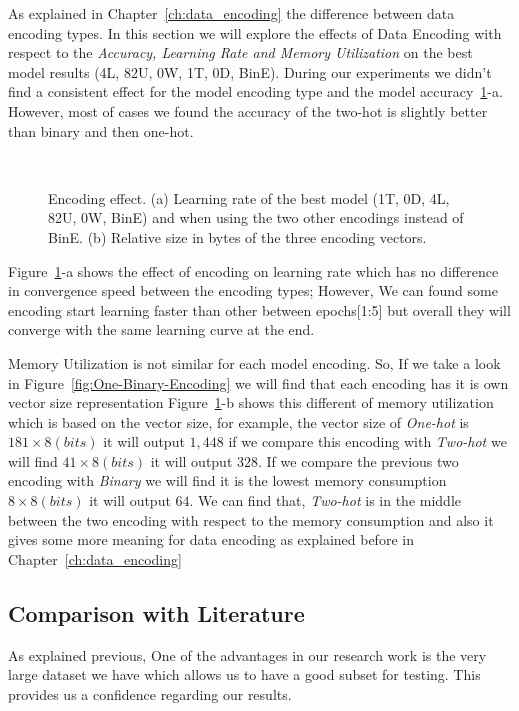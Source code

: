 As explained in Chapter~\ref{ch:data_encoding} the difference between data encoding types. In this section we will explore the effects of Data Encoding with respect to the \textit{Accuracy, Learning Rate and Memory Utilization} on the best model results (4L, 82U, 0W, 1T, 0D, BinE). During our experiments we didn't find a consistent effect for the model encoding type and the model accuracy~\ref{fig:Convergence_Memory}-a. However, most of cases we found the accuracy of the two-hot is slightly better than binary and then one-hot.


\begin{figure}[!h]
  \centering
  \begin{tikzpicture}[scale=1.2]
    
        
  \end{tikzpicture}
  \caption{Encoding effect. (a) Learning rate of the best model (1T, 0D, 4L, 82U, 0W, BinE) and when using the two other encodings instead of BinE. (b) Relative size in bytes of the three encoding vectors.}~\label{fig:Convergence_Memory}
\end{figure}


Figure~\ref{fig:Convergence_Memory}-a shows the effect of encoding on learning rate which has no difference in convergence speed between the encoding types; However, We can found some encoding start learning faster than other between epochs[1:5] but overall they will converge with the same learning curve at the end.


Memory Utilization is not similar for each model encoding. So, If we take a look in Figure~\ref{fig:One-Binary-Encoding} we will find that each encoding has it is own vector size representation Figure~\ref{fig:Convergence_Memory}-b shows this different of memory utilization which is based on the vector size, for example, the vector size of \textit{One-hot} is $181 \times 8(bits)$ it will output $1,448$ if we compare this encoding with \textit{Two-hot} we will find $41 \times 8(bits)$ it will output $328$. If we compare the previous two encoding with \textit{Binary} we will find it is the lowest memory consumption $8 \times 8(bits)$ it will output $64$. We can find that, \textit{Two-hot} is in the middle between the two encoding with respect to the memory consumption and also it gives some more meaning for data encoding as explained before in Chapter~\ref{ch:data_encoding}
\newpage
\subsection{Comparison with Literature}
As explained previous, One of the advantages in our research work is the very large dataset we have which allows us to have a good subset for testing. This provides us a confidence regarding our results.

